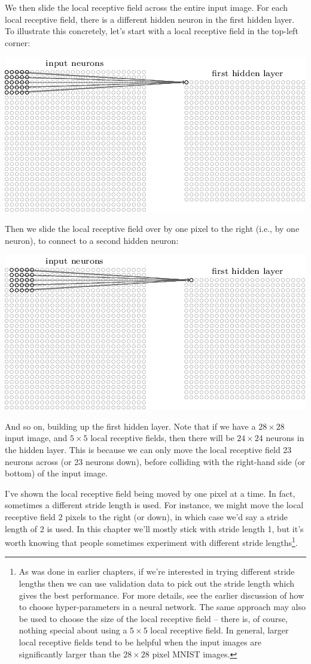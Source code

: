 \documentclass[a4paper,twoside,10pt]{book}
\begin{document}
We then slide the local receptive field across the entire input image. For each local receptive field, there is a different hidden neuron in the first hidden layer. To illustrate this concretely, let's start with a local receptive field in the top-left corner:
\begin{center}
	\includegraphics[height=0.3\linewidth]{figures/ch6/tikz44}
\end{center}
Then we slide the local receptive field over by one pixel to the right (i.e., by one neuron), to connect to a second hidden neuron:
\begin{center}
	\includegraphics[height=0.3\linewidth]{figures/ch6/tikz45}
\end{center}
And so on, building up the first hidden layer. Note that if we have a $28\times28$ input image, and $5\times5$ local receptive fields, then there will be $24\times24$ neurons in the hidden layer. This is because we can only move the local receptive field 23 neurons across (or 23 neurons down), before colliding with the right-hand side (or bottom) of the input image.

I've shown the local receptive field being moved by one pixel at a time. In fact, sometimes a different stride length is used. For instance, we might move the local receptive field 2 pixels to the right (or down), in which case we'd say a stride length of 2 is used. In this chapter we'll mostly stick with stride length 1, but it's worth knowing that people sometimes experiment with different stride lengths\footnote{As was done in earlier chapters, if we're interested in trying different stride lengths then we can use validation data to pick out the stride length which gives the best performance. For more details, see the earlier discussion of how to choose hyper-parameters in a neural network. The same approach may also be used to choose the size of the local receptive field -- there is, of course, nothing special about using a $5\times5$ local receptive field. In general, larger local receptive fields tend to be helpful when the input images are significantly larger than the $28\times28$ pixel MNIST images.}.
\end{document}
